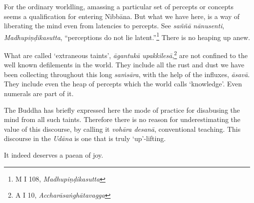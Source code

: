 For the ordinary worldling, amassing a particular set of percepts or concepts seems a qualification for entering Nibbāna. But what we have here, is a way of liberating the mind even from latencies to percepts. See \emph{saññā nānusenti}, \emph{Madhupiṇḍikasutta}, ``perceptions do not lie latent.''\footnote{M I 108, \emph{Madhupiṇḍikasutta}} There is no heaping up anew.

What are called `extraneous taints', \emph{āgantukā upakkilesā},\footnote{A I 10, \emph{Accharāsaṅghātavagga}} are not confined to the well known defilements in the world. They include all the rust and dust we have been collecting throughout this long \emph{saṁsāra}, with the help of the influxes, \emph{āsavā}. They include even the heap of percepts which the world calls `knowledge'. Even numerals are part of it.

The Buddha has briefly expressed here the mode of practice for disabusing the mind from all such taints. Therefore there is no reason for underestimating the value of this discourse, by calling it \emph{vohāra desanā}, conventional teaching. This discourse in the \emph{Udāna} is one that is truly `up'-lifting.

It indeed deserves a paean of joy.
